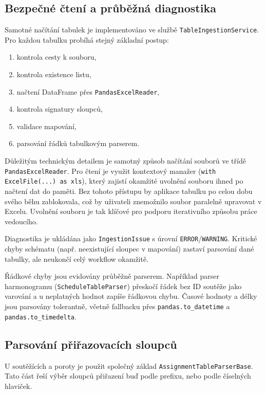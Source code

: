 \documentclass[czech, kiv, ba, he, iso690alph, pdf]{fasthesis}
\begin{document}
			\subsection{Bezpečné čtení a průběžná diagnostika}
				Samotné načítání tabulek je implementováno ve službě \texttt{TableIngestionService}. Pro každou tabulku probíhá stejný základní postup:
				\begin{enumerate}
					\item kontrola cesty k souboru,
					\item kontrola existence listu,
					\item načtení DataFrame přes \texttt{PandasExcelReader},
					\item kontrola signatury sloupců,
					\item validace mapování,
					\item parsování řádků tabulkovým parserem.
				\end{enumerate}
				
				Důležitým technickým detailem je samotný způsob načítání souborů ve třídě \texttt{PandasExcelReader}. Pro čtení je využit kontextový manažer (\texttt{with ExcelFile(...) as xls}), který zajistí okamžité uvolnění souboru ihned po načtení dat do paměti. Bez tohoto přístupu by aplikace tabulku po celou dobu svého běhu zablokovala, což by uživateli znemožnilo soubor paralelně upravovat v Excelu. Uvolnění souboru je tak klíčové pro podporu iterativního způsobu práce vedoucího.				
	
				Diagnostika je ukládána jako \texttt{IngestionIssue} s úrovní \texttt{ERROR}/\texttt{WARNING}. Kritické chyby schématu (např. neexistující sloupec v mapování) zastaví parsování dané tabulky, ale neukončí celý workflow okamžitě.
	
				Řádkové chyby jsou evidovány průběžně parserem. Například parser harmonogramu (\texttt{ScheduleTableParser}) přeskočí řádek bez ID soutěže jako varování a u neplatných hodnot zapíše řádkovou chybu. Časové hodnoty a délky jsou parsovány tolerantně, včetně fallbacku přes \texttt{pandas.to\_datetime} a \texttt{pandas.to\_timedelta}.
	
			\subsection{Parsování přiřazovacích sloupců}
				U soutěžících a poroty je použit společný základ \texttt{AssignmentTableParserBase}. Tato část řeší výběr sloupců přiřazení buď podle prefixu, nebo podle číselných hlaviček.
	
\end{document}
